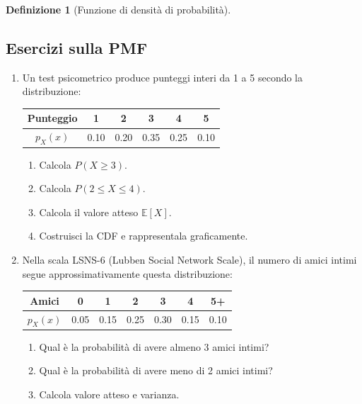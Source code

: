 \documentclass[
  italian,
  letterpaper,
  a4paper,
  11pt,
  open=any]{scrbook}
\newcounter{none} %
\providecommand{\tightlist}{%
  \setlength{\itemsep}{0pt}\setlength{\parskip}{0pt}}
\theoremstyle{plain}
\theoremstyle{definition}
\theoremstyle{definition}
\newtheorem{definition}{Definizione}[chapter]
\theoremstyle{remark}
\begin{document}
\begin{definition}[Funzione di densità di
probabilità]
\begin{tcolorbox}
\subsection*{Esercizi sulla PMF}\label{esercizi-sulla-pmf}

\begin{enumerate}
\def\labelenumi{\arabic{enumi}.}
\setcounter{enumi}{3}
\item
  Un test psicometrico produce punteggi interi da 1 a 5 secondo la
  distribuzione:

  {\def\LTcaptype{none} %
  \begin{longtable}[]{@{}cccccc@{}}
  \toprule\noalign{}
  Punteggio & 1 & 2 & 3 & 4 & 5 \\
  \midrule\noalign{}
  \endhead
  \bottomrule\noalign{}
  \endlastfoot
  \(p_X(x)\) & 0.10 & 0.20 & 0.35 & 0.25 & 0.10 \\
  \end{longtable}
  }

  \begin{enumerate}
  \def\labelenumii{\alph{enumii}.}
  \tightlist
  \item
    Calcola \(P(X \geq 3)\).
  \item
    Calcola \(P(2 \leq X \leq 4)\).
  \item
    Calcola il valore atteso \(\mathbb{E}[X]\).
  \item
    Costruisci la CDF e rappresentala graficamente.
  \end{enumerate}
\item
  Nella scala LSNS-6 (Lubben Social Network Scale), il numero di amici
  intimi segue approssimativamente questa distribuzione:

  {\def\LTcaptype{none} %
  \begin{longtable}[]{@{}ccccccc@{}}
  \toprule\noalign{}
  Amici & 0 & 1 & 2 & 3 & 4 & 5+ \\
  \midrule\noalign{}
  \endhead
  \bottomrule\noalign{}
  \endlastfoot
  \(p_X(x)\) & 0.05 & 0.15 & 0.25 & 0.30 & 0.15 & 0.10 \\
  \end{longtable}
  }

  \begin{enumerate}
  \def\labelenumii{\alph{enumii}.}
  \tightlist
  \item
    Qual è la probabilità di avere almeno 3 amici intimi?
  \item
    Qual è la probabilità di avere meno di 2 amici intimi?
  \item
    Calcola valore atteso e varianza.
  \end{enumerate}
\end{enumerate}


\end{tcolorbox}
\end{definition}
\end{document}
